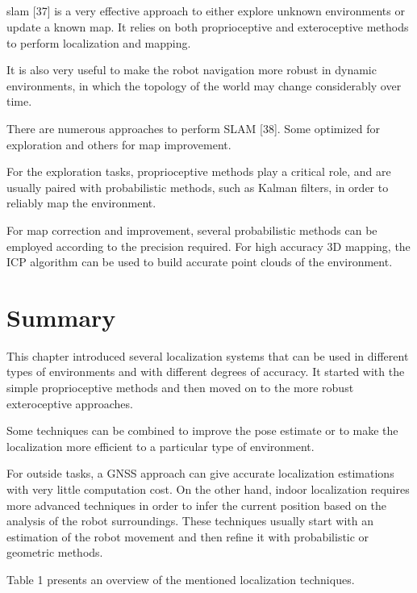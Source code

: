 \subsection{}

\gls{slam} [37] is a very effective approach to either explore unknown environments or update a known map. It relies on both proprioceptive and exteroceptive methods to perform localization and mapping.

It is also very useful to make the robot navigation more robust in dynamic environments, in which the topology of the world may change considerably over time.

There are numerous approaches to perform  SLAM [38]. Some optimized for exploration and others for map improvement.

For the exploration tasks, proprioceptive methods play a critical role, and are usually paired with probabilistic methods, such as Kalman filters, in order to reliably map the environment.

For map correction and improvement, several probabilistic methods can be employed according to the precision required. For high accuracy 3D mapping, the ICP algorithm can be used to build accurate point clouds of the environment.



\section{Summary}

This chapter introduced several localization systems that can be used in different types of environments and with different degrees of accuracy. It started with the simple proprioceptive methods and then moved on to the more robust exteroceptive approaches.

Some techniques can be combined to improve the pose estimate or to make the localization more efficient to a particular type of environment.

For outside tasks, a GNSS approach can give accurate localization estimations with very little computation cost. On the other hand, indoor localization requires more advanced techniques in order to infer the current position based on the analysis of the robot surroundings. These techniques usually start with an estimation of the robot movement and then refine it with probabilistic or geometric methods.

Table 1 presents an overview of the mentioned localization techniques.

